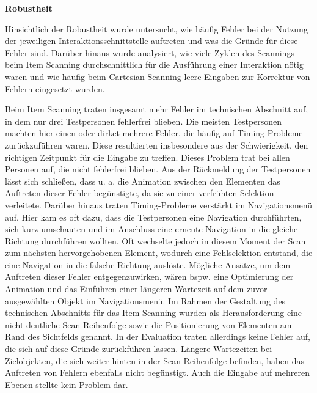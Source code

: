 \textbf{Robustheit}

Hinsichtlich der Robustheit wurde untersucht, wie häufig Fehler bei der Nutzung der jeweiligen Interaktionsschnittstelle auftreten und was die Gründe für diese Fehler sind. Darüber hinaus wurde analysiert, wie viele Zyklen des Scannings beim Item Scanning durchschnittlich für die Ausführung einer Interaktion nötig waren und wie häufig beim Cartesian Scanning leere Eingaben zur Korrektur von Fehlern eingesetzt wurden. 

Beim Item Scanning traten insgesamt mehr Fehler im technischen Abschnitt auf, in dem nur drei Testpersonen fehlerfrei blieben. Die meisten Testpersonen machten hier einen oder dirket mehrere Fehler, die häufig auf Timing-Probleme zurückzuführen waren. Diese resultierten insbesondere aus der Schwierigkeit, den richtigen Zeitpunkt für die Eingabe zu treffen. Dieses Problem trat bei allen Personen auf, die nicht fehlerfrei blieben. Aus der Rückmeldung der Testpersonen lässt sich schließen, dass u. a. die Animation zwischen den Elementen das Auftreten dieser Fehler begünstigte, da sie zu einer verfrühten Selektion verleitete. Darüber hinaus traten Timing-Probleme verstärkt im Navigationsmenü auf.  Hier kam es oft dazu, dass die Testpersonen eine Navigation durchführten, sich kurz umschauten und im Anschluss eine erneute Navigation in die gleiche Richtung durchführen wollten. Oft wechselte jedoch in diesem Moment der Scan zum nächsten hervorgehobenen Element, wodurch eine Fehlselektion entstand, die eine Navigation in die falsche Richtung auslöste. Mögliche Ansätze, um dem Auftreten dieser Fehler entgegenzuwirken, wären bspw. eine Optimierung der Animation und das Einführen einer längeren Wartezeit auf dem zuvor ausgewählten Objekt im Navigationsmenü. 
Im Rahmen der Gestaltung des technischen Abschnitts für das Item Scanning wurden als Herausforderung eine nicht deutliche Scan-Reihenfolge sowie die Positionierung von Elementen am Rand des Sichtfelds genannt. In der Evaluation traten allerdings keine Fehler auf, die sich auf diese Gründe zurückführen lassen. Längere Wartezeiten bei Zielobjekten, die sich weiter hinten in der Scan-Reihenfolge befinden, haben das Auftreten von Fehlern ebenfalls nicht begünstigt. Auch die Eingabe auf mehreren Ebenen stellte kein Problem dar. 

